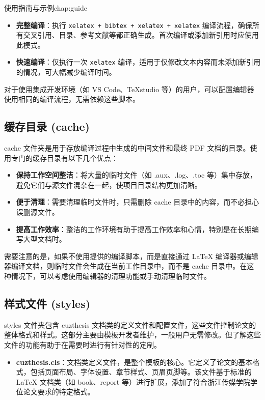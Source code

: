 \begin{cuzchapter}{使用指南与示例}{chap:guide}
    \begin{itemize}
        \item \textbf{完整编译}：执行 \verb|xelatex + bibtex + xelatex + xelatex| 编译流程，确保所有交叉引用、目录、参考文献等都正确生成。首次编译或添加新引用时应使用此模式。

        \item \textbf{快速编译}：仅执行一次 \verb|xelatex| 编译，适用于仅修改文本内容而未添加新引用的情况，可大幅减少编译时间。
    \end{itemize}

    对于使用集成开发环境（如 VS Code、TeXstudio 等）的用户，可以配置编辑器使用相同的编译流程，无需依赖这些脚本。

    \subsection{缓存目录 (cache)}\label{sub:cache}

    cache 文件夹是用于存放编译过程中生成的中间文件和最终 PDF 文档的目录。使用专门的缓存目录有以下几个优点：

    \begin{itemize}
        \item \textbf{保持工作空间整洁}：将大量的临时文件（如 .aux、.log、.toc 等）集中存放，避免它们与源文件混杂在一起，使项目目录结构更加清晰。

        \item \textbf{便于清理}：需要清理临时文件时，只需删除 cache 目录中的内容，而不必担心误删源文件。

        \item \textbf{提高工作效率}：整洁的工作环境有助于提高工作效率和心情，特别是在长期编写大型文档时。
    \end{itemize}

    需要注意的是，如果不使用提供的编译脚本，而是直接通过 \LaTeX{} 编译器或编辑器编译文档，则临时文件会生成在当前工作目录中，而不是 cache 目录中。在这种情况下，可以考虑使用编辑器的清理功能或手动清理临时文件。

    \subsection{样式文件 (styles)}\label{sub:styles}

    styles 文件夹包含 cuzthesis 文档类的定义文件和配置文件，这些文件控制论文的整体格式和样式。这部分主要由模板开发者维护，一般用户无需修改。但了解这些文件的功能有助于在需要时进行有针对性的定制。

    \begin{itemize}
        \item \textbf{cuzthesis.cls}：文档类定义文件，是整个模板的核心。它定义了论文的基本格式，包括页面布局、字体设置、章节样式、页眉页脚等。该文件基于标准的 \LaTeX{} 文档类（如 book、report 等）进行扩展，添加了符合浙江传媒学院学位论文要求的特定格式。


\end{itemize}
\end{cuzchapter}
